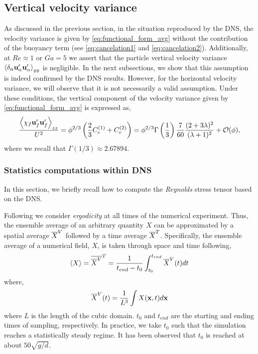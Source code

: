 \subsection{Vertical velocity variance}

As discussed in the previous section, in the situation reproduced by the DNS, the velocity variance is given by \ref{eq:functional_form_avg} without the contribution of the buoyancy term (see \eqref{eq:cancelation1} and \ref{eq:cancelation2}). 
Additionally, at $Re \approx 1$ or $Ga =5$ we assert that the particle vertical velocity variance $\left<\delta_\alpha \textbf{u}_\alpha'\textbf{u}_\alpha'\right>_{yy}$ is negligible. 
In the next subsections, we show that this assumption is indeed confirmed by the DNS results. 
However, for the horizontal velocity variance, we will observe that it is not necessarily a valid assumption. 
Under these conditions, the vertical component of the velocity variance given by \ref{eq:functional_form_avg} is expressed as, 
\begin{equation}
    \frac{\avg{\chi_f \textbf{u}_f'\textbf{u}_f'}_{zz}}{U^2}
    = \phi^{2/3} \left(
        \frac{2}{3}C_e^{(1)}+ C_e^{(2)}
    \right)
    = 
    \phi^{2/3}\Gamma\left(\frac{1}{3}\right) \frac{7}{60}\frac{(2+3\lambda)^2 }{(\lambda+1)^2}
    + \mathcal{O}(\phi), 
    \label{eq:theoritical_simplified}
\end{equation}
where we recall that $\Gamma(1/3) \approx 2.67894$. 

\subsubsection{Statistics computations within DNS}

In this section, we briefly recall how to compute the \textit{Reynolds} stress tensor based on the DNS. 

Following \citet{du2022analysis} we consider \textit{ergodicity} at all times of the numerical experiment.
Thus, the ensemble average of an arbitrary quantity $X$ can be approximated by a spatial average $\overline{X}^V$ followed by a time average $\overline{X}^T$. 
Specifically, the ensemble average of a numerical field, $X$, is taken through space and time following,
\begin{equation}
    \left<X\right>
    = \overline{\overline{X}^V}^T
    = \frac{1}{ t_{end} - t_0}\int_{t_0}^{t_{end}} 
    \overline{X}^V(t) dt
\end{equation}
where, 
\begin{equation}
    \overline{X}^V(t)
    = \frac{1}{L^3}\int 
    X(\textbf{x},t) d\textbf{x}
\end{equation}
where $L$ is the length of the cubic domain.
$t_0$ and $t_{end}$ are the starting and ending times of sampling, respectively.
In practice, we take $t_0$ such that the simulation reaches a statistically steady regime.  
It has been observed that $t_0$ is reached at about $50 \sqrt{g/d}$. 

